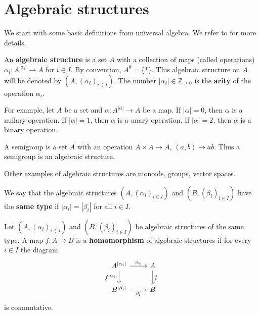 \documentclass{svmult}
\newcommand{\Z}{\mathbb{Z}}
\begin{document}
\section{Algebraic structures}

We start with some basic definitions from universal algebra. We refer
to \cite{MR620952} for more details. 

\begin{definition}
    An \textbf{algebraic structure} is a set $A$ 
    with a collection of maps (called operations) 
    $\alpha_i\colon A^{|\alpha_i|}\to A$ for $i\in I$. By 
    convention, $A^0=\{*\}$. This algebraic structure on $A$ 
    will be denoted by $(A,(\alpha_i)_{i\in I})$. 
    The number $|\alpha_i|\in\Z_{\geq0}$ is the
    \textbf{arity} of the operation $\alpha_i$. 
\end{definition}

For example, let $A$ be a set and 
$\alpha\colon A^{|\alpha|}\to A$ be a map. If $|\alpha|=0$, 
then $\alpha$ is a nullary operation. If $|\alpha|=1$, then 
$\alpha$ is a unary operation. If $|\alpha|=2$, then $\alpha$ is a binary operation. 

\begin{example}
    A semigroup is a set $A$ with an  
    operation $A\times A\to A$, $(a,b)\mapsto ab$. Thus 
    a semigroup 
    is an algebraic structure.
\end{example}

Other examples of algebraic structures are 
monoids, groups, vector spaces. 

\begin{definition}
    We say that the algebraic structures $(A,(\alpha_i)_{i\in I})$ and $(B,(\beta_i)_{i\in I})$ 
    have the \textbf{same type} if $|\alpha_i|=|\beta_i|$ for all $i\in I$.
\end{definition}

\begin{definition}
    Let $(A,(\alpha_i)_{i\in I})$ and $(B,(\beta_i)_{i\in I})$ be 
    algebraic structures of the same type. A map $f\colon A\to B$ 
    is a \textbf{homomorphism} of algebraic structures if 
    for every $i\in I$ the diagram 
    \[
    \begin{tikzcd}
	{A^{|\alpha_i|}} & A \\
	{B^{|\beta_i|}} & B
	\arrow["{\alpha_i}", from=1-1, to=1-2]
	\arrow["f", from=1-2, to=2-2]
	\arrow["{f^{|\alpha_i|}}"', from=1-1, to=2-1]
	\arrow["{\beta_i}"', from=2-1, to=2-2]
    \end{tikzcd}
    \]
    is commutative.     
\end{definition}
\end{document}
